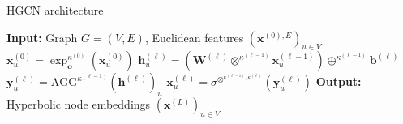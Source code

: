 \begin{algorithm}[h]
    \caption*{HGCN architecture}
    \begin{algorithmic}
    \State \textbf{Input:} Graph $G=(V, E)$, Euclidean features $(\mathbf{x}^{(0), E})_{u\in V}$
    \State 
    \State $\mathbf{x}^{(0)}_u = \exp_{\mathbf{o}}^{\kappa^{(0)}}(\mathbf{x}^{(0)}_u)$ 
            \State $\mathbf{h}^{(\ell)}_u = (\mathbf{W}^{(\ell)} \otimes^{\kappa^{(\ell-1)}} \mathbf{x}^{(\ell-1)}_u) \oplus^{\kappa^{(\ell-1)}} \mathbf{b}^{(\ell)}$ 
            \State $\mathbf{y}^{(\ell)}_u = \text{AGG}^{\kappa^{(\ell-1)}}(\mathbf{h}^{(\ell)})_u$ 
            \State $\mathbf{x}^{(\ell)}_u = \sigma^{\otimes^{\kappa^{(\ell-1)}, \kappa^{(\ell)}}}(\mathbf{y}^{(\ell)}_u)$ 
        \EndFor
    \EndFor
    \State
    \State \textbf{Output:} Hyperbolic node embeddings $(\mathbf{x}^{(L)})_{u\in V}$
    \end{algorithmic}
    \label{alg:HGCN}
\end{algorithm}